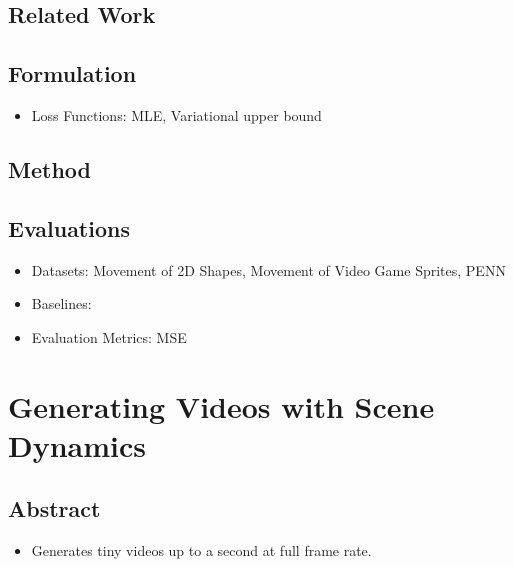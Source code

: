 \documentclass{article}
\begin{document}
    \subsection{Related Work}\label{subsec:Visual_Dynamics_Probabilistic_Future_Frame_Synthesis_via_Cross_Convolutional_Networks:related-work}

    \subsection{Formulation}\label{subsec:Visual_Dynamics_Probabilistic_Future_Frame_Synthesis_via_Cross_Convolutional_Networks:formulation}
    \begin{itemize}
        \item Loss Functions: MLE, Variational upper bound
    \end{itemize}

    \subsection{Method}\label{subsec:Visual_Dynamics_Probabilistic_Future_Frame_Synthesis_via_Cross_Convolutional_Networks:method}

    \subsection{Evaluations}\label{subsec:Visual_Dynamics_Probabilistic_Future_Frame_Synthesis_via_Cross_Convolutional_Networks:evaluations}
    \begin{itemize}
        \item Datasets: Movement of 2D Shapes, Movement of Video Game Sprites, PENN
        \item Baselines:
        \item Evaluation Metrics: MSE
    \end{itemize}
    \newpage


    \section{Generating Videos with Scene Dynamics}\label{sec:Generating_Videos_with_Scene_Dynamics}
    \subsection*{Abstract}
    \begin{itemize}
        \item Generates tiny videos up to a second at full frame rate.
    \end{itemize}
\end{document}
